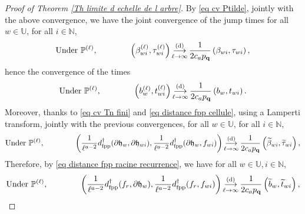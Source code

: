 \documentclass[11pt]{article}
\numberwithin{equation}{section}
\def \N{\mathbb{N}}
\def \U{\mathbb{U}}
\def\P{\mathbb{P}}
\begin{document}
\begin{proof}[Proof of Theorem \ref{Th limite d echelle de l arbre}]
By \eqref{eq cv Ptilde}, jointly with the above convergence, we have the joint convergence of the jump times for all $w \in \U$, for all $i \in \N$,
$$
\text{Under }\P^{(\ell)}, \qquad \qquad
\left(\beta^{(\ell)}_{wi}, \tau^{(\ell)}_{wi}\right) \mathop{\longrightarrow}\limits_{\ell \to \infty}^{(\mathrm{d})} \frac{1}{2c_a p_{\bf q}} \left(\beta_{wi}, \tau_{wi}\right),
$$
hence the convergence of the times
$$
\text{Under }\P^{(\ell)}, \qquad \qquad
\left(b^{(\ell)}_{w}, t^{(\ell)}_{wi}\right) \mathop{\longrightarrow}\limits_{\ell \to \infty}^{(\mathrm{d})} \frac{1}{2c_a p_{\bf q}} \left(b_{w}, t_{wi}\right).
$$
Moreover, thanks to \eqref{eq cv Tn fini} and \eqref{eq distance fpp cellule}, using a Lamperti transform, jointly with the previous convergences, for all $w \in \U$, for all $i \in \N$,
$$
\text{Under }\P^{(\ell)}, \qquad \qquad
\left(\frac{1}{\ell^{a-2}} d^\dagger_\mathrm{fpp}(\partial \mathfrak{h}_w, \partial \mathfrak{h}_{wi}),\frac{1}{\ell^{a-2}}d^\dagger_\mathrm{fpp}(\partial \mathfrak{h}_w, f_{wi})\right) \mathop{\longrightarrow}\limits_{\ell \to \infty}^{(\mathrm{d})} \frac{1}{2c_a p_{\bf q}} \left(\widetilde{\beta}_{wi}, \widetilde{\tau}_{wi}\right),
$$
Therefore, by \eqref{eq distance fpp racine recurrence}, we have for all $w \in \U,i \in \N$,
\begin{equation}\label{eq cv distances fpp racine}
	\text{Under }\P^{(\ell)}, \qquad \qquad
\left(\frac{1}{\ell^{a-2}} d^\dagger_\mathrm{fpp}(f_r, \partial \mathfrak{h}_{w}),\frac{1}{\ell^{a-2}}d^\dagger_\mathrm{fpp}(f_r, f_{wi})\right) \mathop{\longrightarrow}\limits_{\ell \to \infty}^{(\mathrm{d})} \frac{1}{2c_a p_{\bf q}} \left(\widetilde{b}_{w}, \widetilde{t}_{wi}\right),
\end{equation}


\end{proof}
\end{document}
